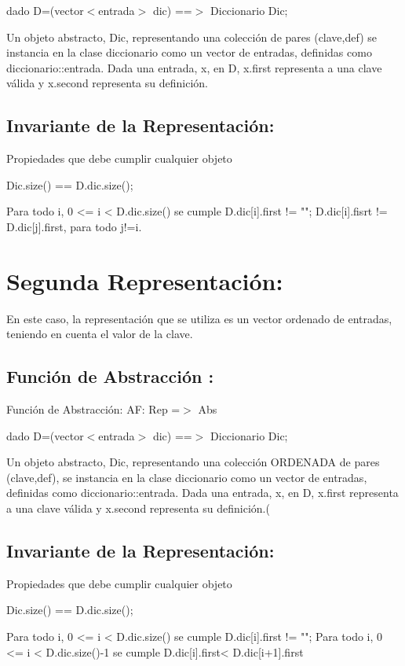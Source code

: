 dado \-D=(vector$<$entrada$>$ dic) ==$>$ \-Diccionario \-Dic;

\-Un objeto abstracto, \-Dic, representando una colección de pares (clave,def) se instancia en la clase diccionario como un vector de entradas, definidas como diccionario\-::entrada. \-Dada una entrada, x, en \-D, x.\-first representa a una clave válida y x.\-second representa su definición.\hypertarget{index_inv_sec1}{}\subsection{\-Invariante de la Representación\-:}\label{index_inv_sec1}
\-Propiedades que debe cumplir cualquier objeto


\begin{DoxyCode}
Dic.size() == D.dic.size();



Para todo i, 0 <= i < D.dic.size() se cumple
        D.dic[i].first != "";
        D.dic[i].fisrt != D.dic[j].first, para todo j!=i.
\end{DoxyCode}
\hypertarget{index_segunda}{}\section{\-Segunda Representación\-:}\label{index_segunda}
\-En este caso, la representación que se utiliza es un vector ordenado de entradas, teniendo en cuenta el valor de la clave.\hypertarget{index_fact_sec2}{}\subsection{\-Función de Abstracción \-:}\label{index_fact_sec2}
\-Función de \-Abstracción\-: \-A\-F\-: \-Rep =$>$ \-Abs

dado \-D=(vector$<$entrada$>$ dic) ==$>$ \-Diccionario \-Dic;

\-Un objeto abstracto, \-Dic, representando una colección \-O\-R\-D\-E\-N\-A\-D\-A de pares (clave,def), se instancia en la clase diccionario como un vector de entradas, definidas como diccionario\-::entrada. \-Dada una entrada, x, en \-D, x.\-first representa a una clave válida y x.\-second representa su definición.(\hypertarget{index_inv_sec2}{}\subsection{\-Invariante de la Representación\-:}\label{index_inv_sec2}
\-Propiedades que debe cumplir cualquier objeto


\begin{DoxyCode}
Dic.size() == D.dic.size();

Para todo i, 0 <= i < D.dic.size() se cumple
        D.dic[i].first != "";
Para todo i, 0 <= i < D.dic.size()-1 se cumple
        D.dic[i].first< D.dic[i+1].first
\end{DoxyCode}
 